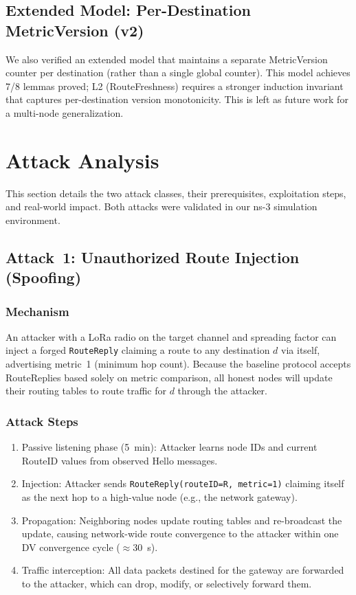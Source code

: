 \documentclass[journal]{IEEEtran}
\begin{document}
\subsection{Extended Model: Per-Destination MetricVersion (v2)}

We also verified an extended model that maintains a separate
MetricVersion counter per destination (rather than a single global
counter). This model achieves 7/8 lemmas proved; L2 (RouteFreshness)
requires a stronger induction invariant that captures per-destination
version monotonicity. This is left as future work for a multi-node
generalization.

\section{Attack Analysis}
\label{sec:attacks}

This section details the two attack classes, their prerequisites,
exploitation steps, and real-world impact. Both attacks were validated
in our ns-3 simulation environment.

\subsection{Attack~1: Unauthorized Route Injection (Spoofing)}

\subsubsection{Mechanism}

An attacker with a LoRa radio on the target channel and spreading
factor can inject a forged \texttt{RouteReply} claiming a route to
any destination $d$ via itself, advertising metric~1 (minimum hop
count). Because the baseline protocol accepts RouteReplies based
solely on metric comparison, all honest nodes will update their
routing tables to route traffic for $d$ through the attacker.

\subsubsection{Attack Steps}
\begin{enumerate}
  \item Passive listening phase (5~min): Attacker learns node IDs
    and current RouteID values from observed Hello messages.
  \item Injection: Attacker sends \texttt{RouteReply(routeID=R,
    metric=1)} claiming itself as the next hop to a high-value node
    (e.g., the network gateway).
  \item Propagation: Neighboring nodes update routing tables and
    re-broadcast the update, causing network-wide route convergence
    to the attacker within one DV convergence cycle ($\approx$30~s).
  \item Traffic interception: All data packets destined for the
    gateway are forwarded to the attacker, which can drop, modify,
    or selectively forward them.
\end{enumerate}
\end{document}
